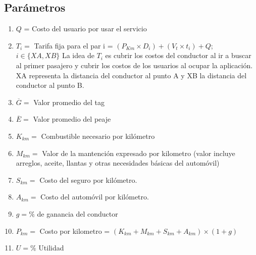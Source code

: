 \documentclass[12pt]{report}
\begin{document}
\subsection*{Parámetros}
\begin{enumerate}
    \item $Q$ = Costo del usuario por usar el servicio
    \item $T_{i}=$ Tarifa fija para el par i = $(P_{Km} \times D_{i})+(V_{t}\times t_{i})+Q$; \, $i \in \{ XA, XB \}$
    La idea de $T_{i}$ es cubrir los costos del conductor al ir a buscar al primer pasajero y cubrir los costos de los usuarios al ocupar la aplicación. XA representa la distancia del conductor al punto A y XB la distancia del conductor al punto B.
    \item $\overline{G}=$ Valor promedio del tag
    \item $\overline{E}=$ Valor promedio del peaje
    \item $K_{km}=$ Combustible necesario por kilómetro
    \item $M_{km}=$ Valor de la mantención expresado por kilometro (valor incluye arreglos, aceite, llantas y otras necesidades básicas del automóvil)
    \item $S_{km}=$ Costo del seguro por kilómetro.
    \item $A_{km}=$ Costo del automóvil por kilómetro.
    \item $g=\%$ de ganancia del conductor 
    \item $P_{km}=$ Costo por kilometro = $(K_{km}+M_{km}+S_{km}+A_{km}) \times (1+g)$
    \item $U=\%$ Utilidad
\end{enumerate}
\end{document}
